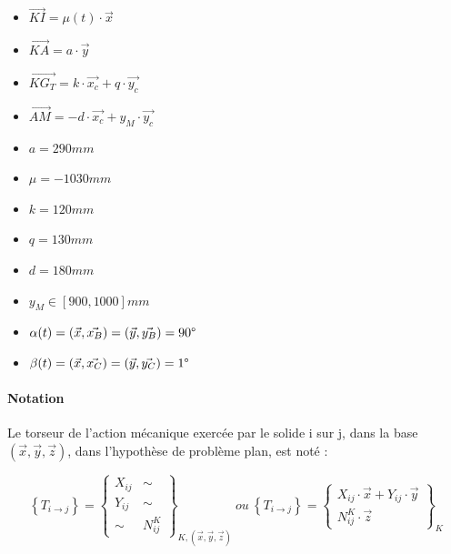 \begin{minipage}{0.3\linewidth}
\begin{itemize}
 \item $\overrightarrow{KI}=\mu(t)\cdot \vec{x}$
 \item $\overrightarrow{KA}=a\cdot \vec{y}$
 \item $\overrightarrow{KG_T}=k\cdot \vec{x_c}+q\cdot \vec{y_c}$
 \item $\overrightarrow{AM}=-d\cdot \vec{x_c}+y_M\cdot \vec{y_c}$
 \end{itemize}
\end{minipage}\hfill
\begin{minipage}{0.3\linewidth}
\begin{itemize}
 \item $a=290mm$
 \item $\mu=-1030mm$
 \item $k=120mm$
 \item $q=130mm$
 \item $d=180mm$
 \item $y_M\in [900,1000]mm$
\end{itemize}
\end{minipage}\hfill
\begin{minipage}{0.36\linewidth}
\begin{itemize}
 \item $\alpha(t)=(\vec{x},\vec{x_B})=(\vec{y},\vec{y_B})=90\degree$
 \item $\beta(t)=(\vec{x},\vec{x_C})=(\vec{y},\vec{y_C})=1\degree$
\end{itemize}
\end{minipage}

\paragraph{Notation} Le torseur de l'action mécanique exercée par le solide i sur j, dans la base $(\vec{x},\vec{y},\vec{z})$, dans l'hypothèse de problème plan, est noté :

$$\left\{T_{i\rightarrow j}\right\}=\left\{
\begin{array}{cc}X_{ij}&\sim\\Y_{ij}&\sim\\ \sim&N_{ij}^K
\end{array}\right\}_{K,(\vec{x},\vec{y},\vec{z})}\ ou\ \left\{T_{i\rightarrow j}\right\}=\left\{
\begin{array}{c}X_{ij}\cdot\vec{x}+Y_{ij}\cdot\vec{y}\\N_{ij}^K\cdot\vec{z}
\end{array}\right\}_K$$

